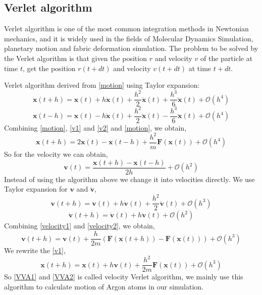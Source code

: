 \documentclass[a4paper,12pt]{article} %
\begin{document}
\subsection{Verlet algorithm}
Verlet algorithm\cite{verlet1967} is one of the most common integration methods in Newtonian mechanics, and it is widely used in the fields of Molecular Dynamics Simulation, planetary motion and fabric deformation simulation. The problem to be solved by the Verlet algorithm is that given the position $r$ and velocity $v$ of the particle at time $t$, get the position $r(t+dt)$ and velocity $v(t+dt)$ at time $t+dt$.\par
Verlet algorithm derived from \eqref{motion} using Taylor expansion:
\begin{equation}\label{v1}
    \boldsymbol{x}(t+h) = \boldsymbol{x}(t) + h\dot{\boldsymbol{x}}(t) + \frac{h^2}{2}\ddot{\boldsymbol{x}}(t) + \frac{h^3}{6}\dddot{\boldsymbol{x}}(t) + \mathcal{O}(h^4)
\end{equation}
\begin{equation}\label{v2}
    \boldsymbol{x}(t-h) = \boldsymbol{x}(t) - h\dot{\boldsymbol{x}}(t) + \frac{h^2}{2}\ddot{\boldsymbol{x}}(t) - \frac{h^3}{6}\dddot{\boldsymbol{x}}(t) + \mathcal{O}(h^4)
\end{equation}
Combining \eqref{motion}, \eqref{v1} and \eqref{v2} and \eqref{motion}, we obtain,
\begin{equation}
    \boldsymbol{x}(t+h) = 2\boldsymbol{x}(t) - \boldsymbol{x}(t-h) + \frac{h^2}{m}\boldsymbol{F}(\boldsymbol{x}(t)) + \mathcal{O}(h^4)
\end{equation}
So for the velocity we can obtain,
\begin{equation}
    \boldsymbol{v}(t) = \frac{\boldsymbol{x}(t+h)-\boldsymbol{x}(t-h)}{2h} + \mathcal{O}(h^2)
\end{equation}
Instead of using the algorithm above we change it into velocities directly. We use Taylor expansion for $\boldsymbol{v}$ and $\boldsymbol{\dot{v}}$,
\begin{equation}\label{velocity1}
    \boldsymbol{v}(t+h) = \boldsymbol{v}(t) + h\boldsymbol{\dot{v}}(t) + \frac{h^2}{2}\boldsymbol{\ddot{v}}(t) + \mathcal{O}(h^3)
\end{equation}
\begin{equation}\label{velocity2}
    \boldsymbol{\dot{v}}(t+h) = \boldsymbol{\dot{v}}(t) + h\boldsymbol{\ddot{v}}(t) + \mathcal{O}(h^2)
\end{equation}
Combining \eqref{velocity1} and \eqref{velocity2}, we obtain,
\begin{equation}\label{VVA1}
    \boldsymbol{v}(t+h) = \boldsymbol{v}(t) + \frac{h}{2m}(\boldsymbol{F}(\boldsymbol{x}(t+h)) - \boldsymbol{F}(\boldsymbol{x}(t))) + \mathcal{O}(h^3)
\end{equation}
We rewrite the \eqref{v1},
\begin{equation}\label{VVA2}
    \boldsymbol{x}(t+h) = \boldsymbol{x}(t) + h\boldsymbol{v}(t) + \frac{h^2}{2m}\boldsymbol{F}(\boldsymbol{x}(t)) + \mathcal{O}(h^3)
\end{equation}
So \eqref{VVA1} and \eqref{VVA2} is called velocity Verlet algorithm, we mainly use this algorithm to calculate motion of Argon atoms in our simulation.\par
\end{document}
